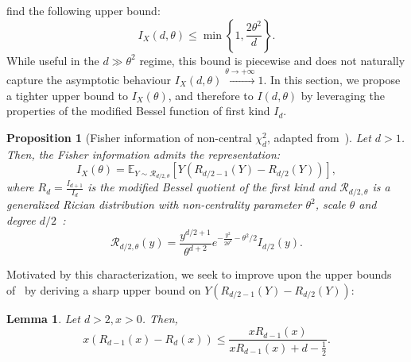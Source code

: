 \documentclass{article}
\theoremstyle{plain}
\newtheorem{proposition}{Proposition}[section]
\newtheorem{lemma}{Lemma}[section]
\theoremstyle{definition}
\theoremstyle{remark}
\begin{document}
\citet{Idier2014} find the following upper bound:
\[I_X(d,\theta) \leq \min\left\{1,\frac{2\theta^2}{d}\right\}.\]
While useful in the $d \gg \theta^2$ regime, this bound is piecewise and does not naturally capture the asymptotic behaviour $I_X(d,\theta) \overset{\theta \to +\infty}{\to} 1$. In this section, we propose a tighter upper bound to $I_X(\theta)$, and therefore to $I(d,\theta)$ by leveraging the properties of the modified Bessel function of first kind $I_d$.

\begin{proposition}[Fisher information of non-central $\chi_d^2$, adapted from~\citet{Idier2014}]
\label{prop:FisherIdier}
    Let $d > 1$. Then, the Fisher information admits the representation:
    \[I_X(\theta) = \mathbb{E}_{Y \sim \mathcal{R}_{d/2,\theta}}[Y (R_{d/2-1}(Y) - R_{d/2}(Y))],\]
    where $R_d = \frac{I_{d+1}}{I_d}$ is the modified Bessel quotient of the first kind and $\mathcal{R}_{d/2,\theta}$ is a generalized Rician distribution with non-centrality parameter $\theta^2$, scale $\theta$ and degree $d/2$~\citep{Idier2014}: 
    \[\mathcal{R}_{d/2,\theta}(y) = \frac{y^{d/2+1}}{\theta^{d+2}} e^{-\frac{y^2 }{2\theta^2} - \theta^2/2} I_{d/2}(y).\]
\end{proposition}

Motivated by this characterization, we seek to improve upon the upper bounds of~\citet{Idier2014} by deriving a sharp upper bound on $Y (R_{d/2-1}(Y) - R_{d/2}(Y))$:

\begin{lemma}
\label{lem:bessel-upper-bound}
    Let $d > 2, x > 0$. Then,
    \[x(R_{d-1}(x) - R_{d}(x)) \leq \frac{x R_{d-1}(x)}{x R_{d-1}(x) + d -\frac{1}{2}}.\]
\end{lemma}
\end{document}
